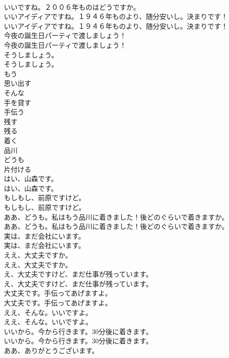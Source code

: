 \documentclass[8pt]{extreport}
\begin{document}
\begin{CJK}{UTF8}{min}
\\	いいですね。２００６年ものはどうですか。 
\\	いいアイディアですね。１９４６年ものより、随分安いし。決まりです！	
\\	いいアイディアですね。１９４６年ものより、随分安いし。決まりです！ 
\\	今夜の誕生日パーティで渡しましょう！	
\\	今夜の誕生日パーティで渡しましょう！ 
\\	そうしましょう。	
\\	そうしましょう。 
\\	もう
\\	思い出す
\\	そんな
\\	手を貸す
\\	手伝う
\\	残す
\\	残る
\\	着く
\\	品川
\\	どうも
\\	片付ける
\\	はい、山森です。	
\\	はい、山森です。 
\\	もしもし、前原ですけど。	
\\	もしもし、前原ですけど。 
\\	ああ、どうも。私はもう品川に着きました！後どのぐらいで着きますか。	
\\	ああ、どうも。私はもう品川に着きました！後どのぐらいで着きますか。 
\\	実は、まだ会社にいます。	
\\	実は、まだ会社にいます。 
\\	ええ、大丈夫ですか。	
\\	ええ、大丈夫ですか。 
\\	え、大丈夫ですけど、まだ仕事が残っています。	
\\	え、大丈夫ですけど、まだ仕事が残っています。 
\\	大丈夫です。手伝ってあげますよ。	
\\	大丈夫です。手伝ってあげますよ。 
\\	ええ、そんな。いいですよ。	
\\	ええ、そんな。いいですよ。 
\\	いいから。今から行きます。30分後に着きます。	
\\	いいから。今から行きます。30分後に着きます。 
\\	ああ、ありがとうございます。	

\end{CJK}
\end{document}
